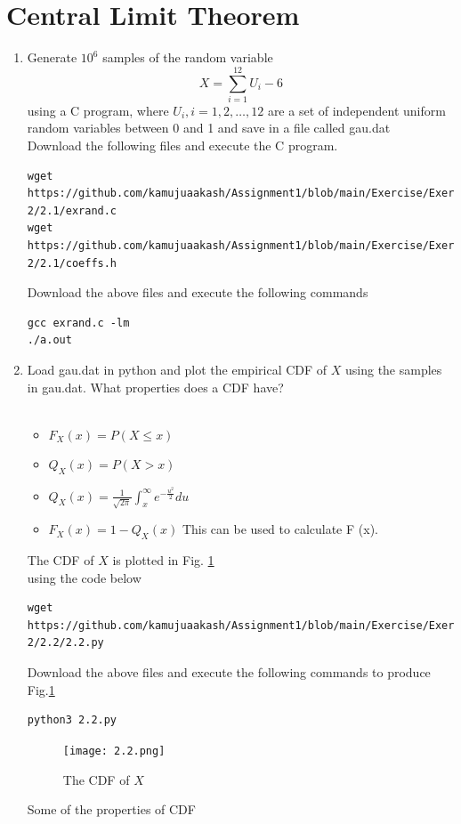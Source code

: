 \documentclass[journal,12pt,twocolumn]{IEEEtran}
\renewcommand\thesection{\arabic{section}}
\begin{document}
\section{Central Limit Theorem}
%
\begin{enumerate}[label=\thesection.\arabic*
,ref=\thesection.\theenumi]
%
\item
Generate $10^6$ samples of the random variable
%
\begin{equation}
X = \sum_{i=1}^{12}U_i -6
\end{equation}
%
using a C program, where $U_i, i = 1,2,\dots, 12$ are  a set of independent uniform random variables between 0 and 1 and save in a file called gau.dat\\
\solution Download the following files and execute the  C program.
\begin{lstlisting}
wget https://github.com/kamujuaakash/Assignment1/blob/main/Exercise/Exercise-2/2.1/exrand.c
wget https://github.com/kamujuaakash/Assignment1/blob/main/Exercise/Exercise-2/2.1/coeffs.h
\end{lstlisting}
Download the above files and execute the following commands
\begin{lstlisting}
gcc exrand.c -lm
./a.out
\end{lstlisting}
\item
Load gau.dat in python and plot the empirical CDF of $X$ using the samples in gau.dat. What properties does a CDF have?\\
\solution \\
\begin{itemize}
\item $F_X (x)=P(X \leq x) $
\item $Q_X (x) = P(X > x)$
\item $Q_X (x) =\frac{1}{\sqrt{2\pi}} \int_{x} ^{\infty} e^{-\frac{u^2}{2}} du$
\item  $F_X (x) = 1 - Q_X (x)$ This can be used to calculate F (x).
\end{itemize}
The CDF of $X$ is plotted in Fig. \ref{fig:2.2}\\
using the code below
\begin{lstlisting}
wget https://github.com/kamujuaakash/Assignment1/blob/main/Exercise/Exercise-2/2.2/2.2.py
\end{lstlisting}
Download the above files and execute the following commands to produce Fig.\ref{fig:2.2}
\begin{lstlisting}
python3 2.2.py
\end{lstlisting}
\begin{figure}[!h]
\centering
\texttt{[image: 2.2.png]}
\caption{The CDF of $X$}
\label{fig:2.2}
\end{figure}
Some of the properties of CDF 


\end{enumerate}
\end{document}
